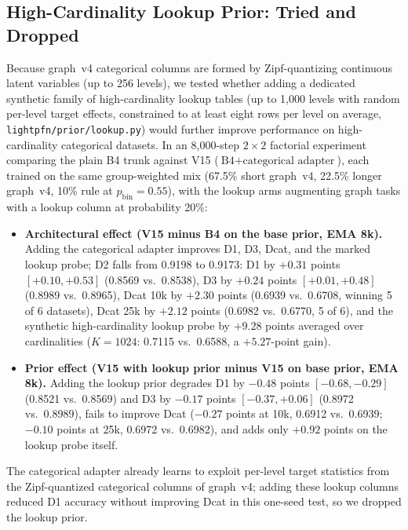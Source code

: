 \documentclass[11pt]{article}
\begin{document}
\subsection{High-Cardinality Lookup Prior: Tried and Dropped}
\label{sec:lookup}

Because graph~v4 categorical columns are formed by Zipf-quantizing continuous latent variables (up to 256 levels), we tested whether adding a dedicated synthetic family of high-cardinality lookup tables (up to 1,000 levels with random per-level target effects, constrained to at least eight rows per level on average, \texttt{lightpfn/prior/lookup.py}) would further improve performance on high-cardinality categorical datasets.
In an 8,000-step $2\times 2$ factorial experiment comparing the plain B4 trunk against V15 ($\text{B4} + \text{categorical adapter}$), each trained on the same group-weighted mix (67.5\% short graph~v4, 22.5\% longer graph~v4, 10\% rule at $p_{\mathrm{bin}}=0.55$), with the lookup arms augmenting graph tasks with a lookup column at probability 20\%: %
\begin{itemize}
\item \textbf{Architectural effect (V15 minus B4 on the base prior, EMA 8k).}
Adding the categorical adapter improves D1, D3, Dcat, and the marked lookup probe; D2 falls from 0.9198 to 0.9173: D1 by $+0.31$ points $[+0.10, +0.53]$ (0.8569 vs.\ 0.8538), D3 by $+0.24$ points $[+0.01, +0.48]$ (0.8989 vs.\ 0.8965), Dcat 10k by $+2.30$ points (0.6939 vs.\ 0.6708, winning 5 of 6 datasets), Dcat 25k by $+2.12$ points (0.6982 vs.\ 0.6770, 5 of 6), and the synthetic high-cardinality lookup probe by $+9.28$ points averaged over cardinalities ($K=1024$: 0.7115 vs.\ 0.6588, a $+5.27$-point gain). %
\item \textbf{Prior effect (V15 with lookup prior minus V15 on base prior, EMA 8k).}
Adding the lookup prior degrades D1 by $-0.48$ points $[-0.68, -0.29]$ (0.8521 vs.\ 0.8569) and D3 by $-0.17$ points $[-0.37, +0.06]$ (0.8972 vs.\ 0.8989), fails to improve Dcat ($-0.27$ points at 10k, 0.6912 vs.\ 0.6939; $-0.10$ points at 25k, 0.6972 vs.\ 0.6982), and adds only $+0.92$ points on the lookup probe itself. %
\end{itemize}
The categorical adapter already learns to exploit per-level target statistics from the Zipf-quantized categorical columns of graph~v4; adding these lookup columns reduced D1 accuracy without improving Dcat in this one-seed test, so we dropped the lookup prior.
\end{document}
